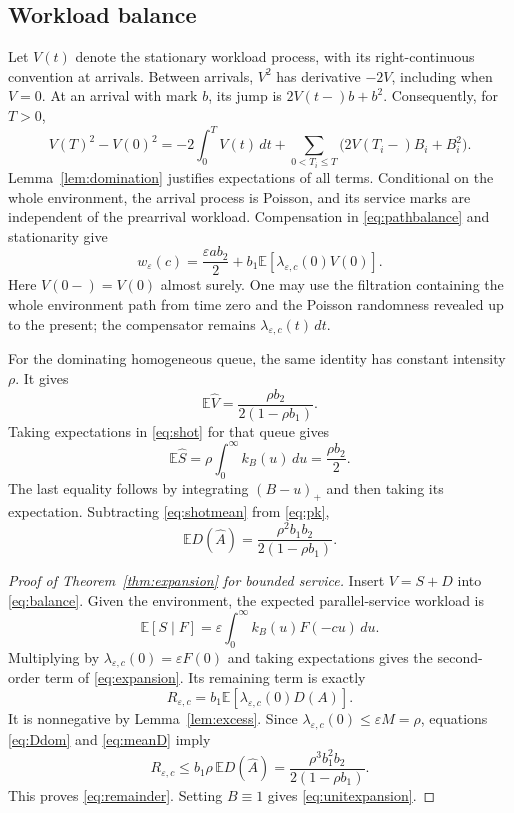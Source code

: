 \documentclass[aap,preprint]{imsart}
\numberwithin{equation}{section}
\theoremstyle{plain}
\theoremstyle{definition}
\newcommand{\E}{\mathbb E}
\newcommand{\1}{\mathbf 1}
\newcommand{\eps}{\varepsilon}
\begin{document}
\subsection{Workload balance}
Let $V(t)$ denote the stationary workload process, with its right-continuous convention at arrivals. Between arrivals, $V^2$ has derivative $-2V$, including when $V=0$. At an arrival with mark $b$, its jump is $2V(t-)b+b^2$. Consequently, for $T>0$,
\begin{equation}\label{eq:pathbalance}
 V(T)^2-V(0)^2=-2\int_0^T V(t)\,dt
 +\sum_{0<T_i\le T}\bigl(2V(T_i-)B_i+B_i^2\bigr).
\end{equation}
Lemma~\ref{lem:domination} justifies expectations of all terms. Conditional on the whole environment, the arrival process is Poisson, and its service marks are independent of the prearrival workload. Compensation in \eqref{eq:pathbalance} and stationarity give
\begin{equation}\label{eq:balance}
 w_\eps(c)=\frac{\eps a b_2}{2}+b_1\E[\lambda_{\eps,c}(0)V(0)].
\end{equation}
Here $V(0-)=V(0)$ almost surely. One may use the filtration containing the whole environment path from time zero and the Poisson randomness revealed up to the present; the compensator remains $\lambda_{\eps,c}(t)\,dt$.

For the dominating homogeneous queue, the same identity has constant intensity $\rho$. It gives
\begin{equation}\label{eq:pk}
 \E\widehat V=\frac{\rho b_2}{2(1-\rho b_1)}.
\end{equation}
Taking expectations in \eqref{eq:shot} for that queue gives
\begin{equation}\label{eq:shotmean}
 \E\widehat S=\rho\int_0^\infty k_B(u)\,du=\frac{\rho b_2}{2}.
\end{equation}
The last equality follows by integrating $(B-u)_+$ and then taking its expectation. Subtracting \eqref{eq:shotmean} from \eqref{eq:pk},
\begin{equation}\label{eq:meanD}
 \E D(\widehat A)=\frac{\rho^2 b_1b_2}{2(1-\rho b_1)}.
\end{equation}
\begin{proof}[Proof of Theorem~\ref{thm:expansion} for bounded service]
Insert $V=S+D$ into \eqref{eq:balance}. Given the environment, the expected parallel-service workload is
\[
 \E[S\mid F]=\eps\int_0^\infty k_B(u)F(-cu)\,du.
\]
Multiplying by $\lambda_{\eps,c}(0)=\eps F(0)$ and taking expectations gives the second-order term of \eqref{eq:expansion}. Its remaining term is exactly
\begin{equation}\label{eq:Rexact}
 R_{\eps,c}=b_1\E[\lambda_{\eps,c}(0)D(A)].
\end{equation}
It is nonnegative by Lemma~\ref{lem:excess}. Since $\lambda_{\eps,c}(0)\le\eps M=\rho$, equations \eqref{eq:Ddom} and \eqref{eq:meanD} imply
\[
 R_{\eps,c}\le b_1\rho\,\E D(\widehat A)
 =\frac{\rho^3 b_1^2b_2}{2(1-\rho b_1)}.
\]
This proves \eqref{eq:remainder}. Setting $B\equiv1$ gives \eqref{eq:unitexpansion}.
\end{proof}
\end{document}
